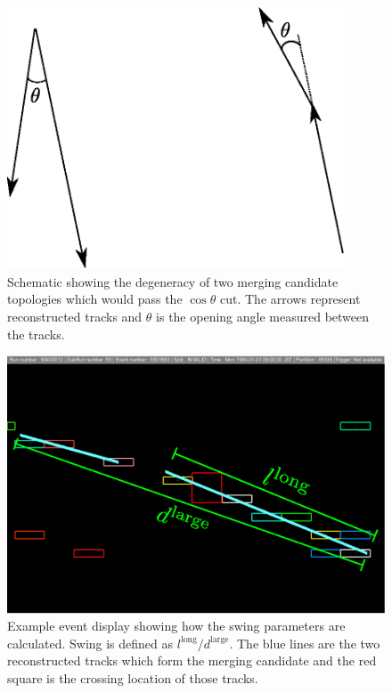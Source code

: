 \begin{figure}[!b]
  \centering
  \includegraphics[width=10cm]{images/selection/vertex_recon/TrackMergingCosThetaDegeneracySchematic.eps}
  \caption{Schematic showing the degeneracy of two merging candidate topologies which would pass the $\cos\theta$ cut.  The arrows represent reconstructed tracks and $\theta$ is the opening angle measured between the tracks.}
  \label{fig:TrackMergingCosThetaDegeneracySchematic}
\end{figure}
\begin{figure}
  \centering
  \includegraphics[width=12cm]{images/selection/vertex_recon/track_merging_event_display_swing.eps}
  \caption{Example event display showing how the swing parameters are calculated.  Swing is defined as $l^{\textrm{long}}/d^{\textrm{large}}$.  The blue lines are the two reconstructed tracks which form the merging candidate and the red square is the crossing location of those tracks.}
  \label{fig:TrackMergingEventDisplaySwing}
\end{figure}
